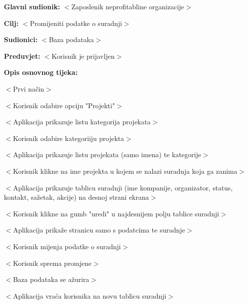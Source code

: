					\noindent {}
					\begin{packed_item}

						\item \textbf{Glavni sudionik: }$<$Zaposlenik neprofitabline organizacije$>$
						\item  \textbf{Cilj:} $<$Promijeniti podatke o suradnji$>$
						\item  \textbf{Sudionici:} $<$Baza podataka$>$
						\item  \textbf{Preduvjet:} $<$Korisnik je prijavljen$>$
						\item  \textbf{Opis osnovnog tijeka:}

						\item[] \begin{packed_enum}

							\item $<$Prvi način$>$

							\item[] \begin{packed_item}

								\item $<$Korisnik odabire opciju "Projekti"$>$
								\item $<$Aplikacija prikazuje listu kategorija projekata$>$
								\item $<$Korisnik odabire kategoriiju projekta$>$
								\item $<$Aplikacija prikazuje listu projekata (samo imena) te kategorije$>$
								\item $<$Korisnik klikne na ime projekta u kojem se nalazi suradnja koja ga zanima$>$
								\item $<$Aplikacija prikazuje tablicu suradnji (ime kompanije, organizator, status,
								kontakt, sažetak, akcije) na desnoj strani ekrana$>$
								\item $<$Korisnik klikne na gumb "uredi" u najdesnijem polju tablice suradnji$>$
								\item $<$Aplikacija prikaže stranicu samo s podatcima te suradnje$>$
								\item $<$Korisnik mijenja podatke o suradnji$>$
								\item $<$Korisnik sprema promjene$>$
								\item $<$Baza podataka se ažurira$>$
								\item $<$Aplikacija vraća korisnika na novu tablicu suradnji$>$

							\end{packed_item}


\end{packed_enum}
\end{packed_item}
